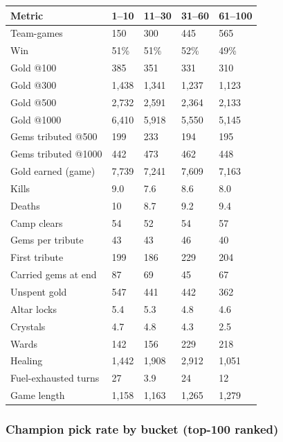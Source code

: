 \documentclass[
  10pt,
]{article}
\newcounter{none} %
\begin{document}
{\def\LTcaptype{none} %
\begin{longtable}[]{@{}lllll@{}}
\toprule\noalign{}
Metric & 1--10 & 11--30 & 31--60 & 61--100 \\
\midrule\noalign{}
\endhead
\bottomrule\noalign{}
\endlastfoot
Team-games & 150 & 300 & 445 & 565 \\
Win & 51\% & 51\% & 52\% & 49\% \\
Gold @100 & 385 & 351 & 331 & 310 \\
Gold @300 & 1,438 & 1,341 & 1,237 & 1,123 \\
Gold @500 & 2,732 & 2,591 & 2,364 & 2,133 \\
Gold @1000 & 6,410 & 5,918 & 5,550 & 5,145 \\
Gems tributed @500 & 199 & 233 & 194 & 195 \\
Gems tributed @1000 & 442 & 473 & 462 & 448 \\
Gold earned (game) & 7,739 & 7,241 & 7,609 & 7,163 \\
Kills & 9.0 & 7.6 & 8.6 & 8.0 \\
Deaths & 10 & 8.7 & 9.2 & 9.4 \\
Camp clears & 54 & 52 & 54 & 57 \\
Gems per tribute & 43 & 43 & 46 & 40 \\
First tribute & 199 & 186 & 229 & 204 \\
Carried gems at end & 87 & 69 & 45 & 67 \\
Unspent gold & 547 & 441 & 442 & 362 \\
Altar locks & 5.4 & 5.3 & 4.8 & 4.6 \\
Crystals & 4.7 & 4.8 & 4.3 & 2.5 \\
Wards & 142 & 156 & 229 & 218 \\
Healing & 1,442 & 1,908 & 2,912 & 1,051 \\
Fuel-exhausted turns & 27 & 3.9 & 24 & 12 \\
Game length & 1,158 & 1,163 & 1,265 & 1,279 \\
\end{longtable}
}

\subsubsection{Champion pick rate by bucket (top-100
ranked)}\label{champion-pick-rate-by-bucket-top-100-ranked}
\end{document}
